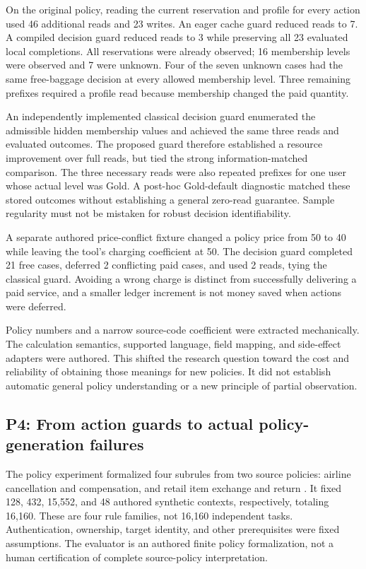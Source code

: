 \documentclass[10pt,twocolumn,letterpaper]{article}
\begin{document}
On the original policy, reading the current reservation and profile for every action used 46 additional reads and 23 writes. An eager cache guard reduced reads to 7. A compiled decision guard reduced reads to 3 while preserving all 23 evaluated local completions. All reservations were already observed; 16 membership levels were observed and 7 were unknown. Four of the seven unknown cases had the same free-baggage decision at every allowed membership level. Three remaining prefixes required a profile read because membership changed the paid quantity.

An independently implemented classical decision guard enumerated the admissible hidden membership values and achieved the same three reads and evaluated outcomes. The proposed guard therefore established a resource improvement over full reads, but tied the strong information-matched comparison. The three necessary reads were also repeated prefixes for one user whose actual level was Gold. A post-hoc Gold-default diagnostic matched these stored outcomes without establishing a general zero-read guarantee. Sample regularity must not be mistaken for robust decision identifiability.

A separate authored price-conflict fixture changed a policy price from 50 to 40 while leaving the tool's charging coefficient at 50. The decision guard completed 21 free cases, deferred 2 conflicting paid cases, and used 2 reads, tying the classical guard. Avoiding a wrong charge is distinct from successfully delivering a paid service, and a smaller ledger increment is not money saved when actions were deferred.

Policy numbers and a narrow source-code coefficient were extracted mechanically. The calculation semantics, supported language, field mapping, and side-effect adapters were authored. This shifted the research question toward the cost and reliability of obtaining those meanings for new policies. It did not establish automatic general policy understanding or a new principle of partial observation.

\subsection{P4: From action guards to actual policy-generation failures}
The policy experiment formalized four subrules from two source policies: airline cancellation and compensation, and retail item exchange and return \cite{pfpolicy}. It fixed 128, 432, 15,552, and 48 authored synthetic contexts, respectively, totaling 16,160. These are four rule families, not 16,160 independent tasks. Authentication, ownership, target identity, and other prerequisites were fixed assumptions. The evaluator is an authored finite policy formalization, not a human certification of complete source-policy interpretation.
\end{document}
